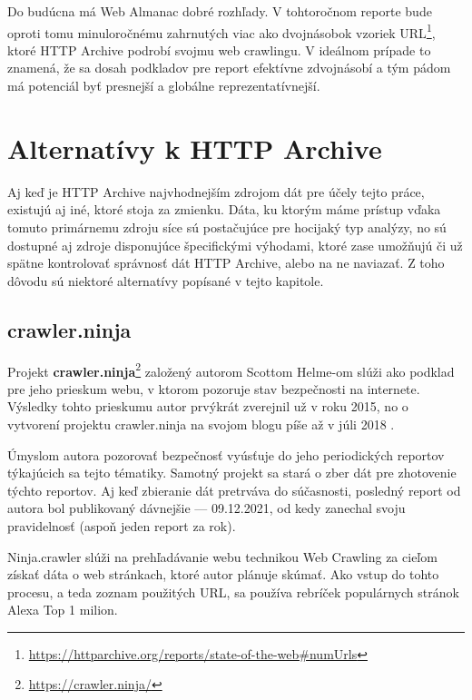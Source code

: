 Do budúcna má Web Almanac dobré rozhľady. V tohtoročnom reporte bude oproti tomu minuloročnému zahrnutých viac ako dvojnásobok vzoriek URL\footnote{\href{https://httparchive.org/reports/state-of-the-web\#numUrls}{https://httparchive.org/reports/state-of-the-web\#numUrls}}, ktoré HTTP Archive podrobí svojmu web crawlingu.
V ideálnom prípade to znamená, že sa dosah podkladov pre report efektívne zdvojnásobí a tým pádom má potenciál byť presnejší a globálne reprezentatívnejší.


\section{Alternatívy k HTTP Archive}
\label{httparchive-alternatives}

Aj keď je HTTP Archive najvhodnejším zdrojom dát pre účely tejto práce, existujú aj iné, ktoré stoja za zmienku.
Dáta, ku ktorým máme prístup vďaka tomuto primárnemu zdroju síce sú postačujúce pre hocijaký typ analýzy, no sú dostupné aj zdroje disponujúce špecifickými výhodami, ktoré
zase umožňujú či už spätne kontrolovať správnosť dát HTTP Archive, alebo na ne naviazať.
Z toho dôvodu sú niektoré alternatívy popísané v tejto kapitole.

\subsection{crawler.ninja}

Projekt \textbf{crawler.ninja}\footnote{\href{https://crawler.ninja/}{https://crawler.ninja/}} založený autorom Scottom Helme-om slúži ako podklad pre jeho prieskum
webu, v ktorom pozoruje stav bezpečnosti na internete. 
Výsledky tohto prieskumu autor prvýkrát zverejnil už v roku 2015, no o vytvorení projektu crawler.ninja na svojom blogu píše až v júli 2018 \cite{crawler-ninja}. 

Úmyslom autora pozorovať bezpečnosť vyúsťuje do jeho periodických reportov týkajúcich sa tejto tématiky. 
Samotný projekt sa stará o zber dát pre zhotovenie týchto reportov.
Aj keď zbieranie dát pretrváva do súčasnosti, posledný report od autora bol publikovaný dávnejšie --- 09.12.2021, od kedy zanechal svoju pravidelnosť (aspoň jeden report za rok).

Ninja.crawler slúži na prehľadávanie webu technikou Web Crawling za cieľom získať dáta o web stránkach, ktoré autor plánuje skúmať.
Ako vstup do tohto procesu, a teda zoznam použitých URL, sa používa rebríček populárnych stránok Alexa Top 1 milion.

